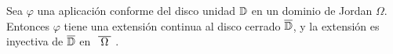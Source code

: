 \begin{comment} %
\begin{prop}
    Sea $U \subset \complex$. Una aplicación $f: U \to \complex$ es conforme en $U$ si satisface las condiciones de Cauchy-Riemann y $f'(z) \not = 0$ para todo $z \in U$.
\end{prop}

\begin{proof}
    Sea $f$ una función continua tal que $f(z) = u(x,y) + i v(x,y), \, z = x+iv$. Sabemos, por hipótesis, que $u(x,y)$ y $v(x,y)$ son funciones continuamente diferenciables. \\

    Consideremos la curva suave $\gamma : [a,b] \to U$, que escribimos como $\gamma (t) = \rho (t) + i \sigma (t)$. Entonces,
    \begin{equation*}
        f(\gamma (t)) = u(\rho (t), \sigma (t)) + i v(\rho (t), \sigma (t)).
    \end{equation*}

    Como $f(\gamma (t))$ es continuamente diferenciable,
    \begin{equation}
        \label{eq:cauchy-riemann}
        \frac{d}{dt}f(\gamma (t)) = u_x \rho' (t) + u_y \sigma' (t) + i (v_x \rho'(t) + v_y \sigma'(t)).
    \end{equation}

    Por hipótesis tenemos que
    \begin{equation*}
        \frac{\partial (u,v)}{\partial (x,y)} =
        \left|
        \begin{matrix}
            u_x(x,y) & u_y(x,y) \\ v_x(x,y) & v_y(x,y)
        \end{matrix}
        \right| \not = 0,
    \end{equation*}
    por lo que $\frac{d}{dt} f(\gamma (t)) \not = 0$ en $t = 0$ pues $\rho' (t) + i \sigma' (t) = \gamma' (t) \not = 0$. Es decir, la curva $f (\gamma)$ es suave en un entorno de su origen. Por lo tanto, si $\gamma_1$ y $\gamma_2$ son curvas suaves con origen $c$, el ángulo entre $f(\gamma_1)$ y $f(\gamma_2)$ en $f(c)$ está bien definido. \\
\end{proof}
\end{comment}

\begin{theorem}
    \label{th:caratheodory}
    Sea $\varphi$ una aplicación conforme del disco unidad $\mathbb{D}$ en un dominio de Jordan $\Omega$. Entonces $\varphi$ tiene una extensión continua al disco cerrado $\overline{\mathbb{D}}$, y la extensión es inyectiva de $\overline{\mathbb{D}}$ en $\xbar{\Omega}$.
\end{theorem}

